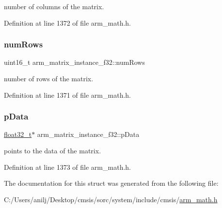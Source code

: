 number of columns of the matrix. 

Definition at line 1372 of file arm\+\_\+math.\+h.

\mbox{\label{structarm__matrix__instance__f32_a23f4e34d70a82c9cad7612add5640b7b}} 
\subsubsection{\texorpdfstring{num\+Rows}{numRows}}
{\footnotesize\ttfamily uint16\+\_\+t arm\+\_\+matrix\+\_\+instance\+\_\+f32\+::num\+Rows}

number of rows of the matrix. 

Definition at line 1371 of file arm\+\_\+math.\+h.

\mbox{\label{structarm__matrix__instance__f32_af3917c032600a9dfd5ed4a96f074910a}} 
\subsubsection{\texorpdfstring{p\+Data}{pData}}
{\footnotesize\ttfamily \hyperlink{arm__math_8h_a4611b605e45ab401f02cab15c5e38715}{float32\+\_\+t}$\ast$ arm\+\_\+matrix\+\_\+instance\+\_\+f32\+::p\+Data}

points to the data of the matrix. 

Definition at line 1373 of file arm\+\_\+math.\+h.



The documentation for this struct was generated from the following file\+:\begin{DoxyCompactItemize}
\item 
C\+:/\+Users/anilj/\+Desktop/cmsis/sorc/system/include/cmsis/\hyperlink{arm__math_8h}{arm\+\_\+math.\+h}\end{DoxyCompactItemize}

